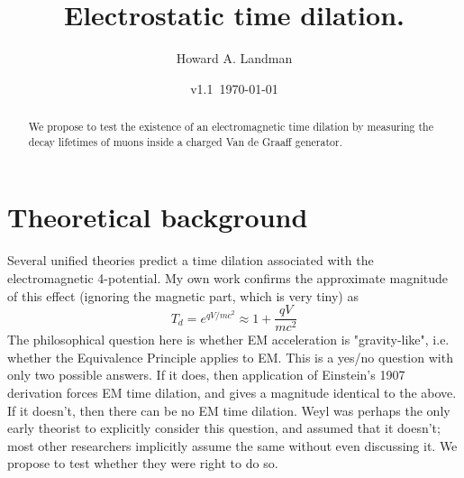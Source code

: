 \documentclass[12pt]{amsart}
\title{Electrostatic time dilation.}
\author{Howard A. Landman}
\date{v1.1\ \today} %
\theoremstyle{plain}
\theoremstyle{definition}
\theoremstyle{remark}
\begin{document}
\maketitle


\begin{abstract}
We propose to test the existence of an electromagnetic time dilation
by measuring the decay lifetimes of muons inside a charged Van de Graaff generator.

\end{abstract}


\section{Theoretical background}

Several unified theories\cite{Apsel1978,Apsel1979,Apsel1981,Rodrigues1983,Ryff1985,Beil1987,Dubey2015,Ogonowski2012}
predict a time dilation associated with the electromagnetic 4-potential.
My own work\cite{Landman2017,Landman2020} confirms the approximate magnitude of this effect (ignoring the magnetic part, which is very tiny) as
\[ T_d =  e^{qV/mc^2} \approx  1 + \frac{qV}{mc^2} \]
The philosophical question here is whether EM acceleration is "gravity-like",
i.e. whether the Equivalence Principle applies to EM.
This is a yes/no question with only two possible answers.
If it does, then application of Einstein's 1907 derivation\cite{Einstein1907} forces EM time dilation,
and gives a magnitude identical to the above.
If it doesn't, then there can be no EM time dilation.
Weyl was perhaps the only early theorist to explicitly consider this question, and assumed that it doesn't\cite[pp. 304-305]{Weyl1923};
most other researchers implicitly assume the same without even discussing it.
We propose to test whether they were right to do so.

\end{document}
